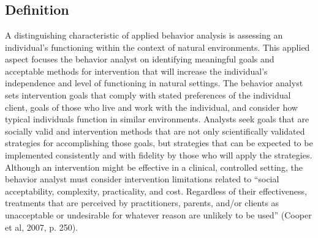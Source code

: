 \section[\fourjEight{}]{\fourjEight{}%
              }
\subsection{Definition}
A distinguishing characteristic of applied behavior analysis is assessing an individual's functioning within the context of natural environments. This applied aspect focuses the behavior analyst on identifying meaningful goals and acceptable methods for intervention that will increase the individual's independence and level of functioning in natural settings. The behavior analyst sets intervention goals that comply with stated preferences of the individual client, goals of those who live and work with the individual, and consider how typical individuals function in similar environments. Analysts seek goals that are socially valid and intervention methods that are not only scientifically validated strategies for accomplishing those goals, but strategies that can be expected to be implemented consistently and with fidelity by those who will apply the strategies. Although an intervention might be effective in a clinical, controlled setting, the behavior analyst must consider intervention limitations related to ``social acceptability, complexity, practicality, and cost. Regardless of their effectiveness, treatments that are perceived by practitioners, parents, and/or clients as unacceptable or undesirable for whatever reason are unlikely to be used'' (Cooper et al, 2007, p. 250).
%
